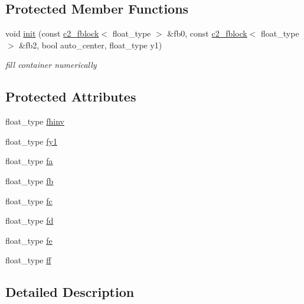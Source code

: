 \subsection*{Protected Member Functions}
\begin{DoxyCompactItemize}
\item 
void \hyperlink{classc2__connector__function__p_af5f4cfcfcaf990a779710f25dedfff9b}{init} (const \hyperlink{classc2__fblock}{c2\+\_\+fblock}$<$ float\+\_\+type $>$ \&fb0, const \hyperlink{classc2__fblock}{c2\+\_\+fblock}$<$ float\+\_\+type $>$ \&fb2, bool auto\+\_\+center, float\+\_\+type y1)
\begin{DoxyCompactList}\small\item\em fill container numerically \end{DoxyCompactList}\end{DoxyCompactItemize}
\subsection*{Protected Attributes}
\begin{DoxyCompactItemize}
\item 
float\+\_\+type \hyperlink{classc2__connector__function__p_aa9bafcf757d0607f897ab5e7d0acfb72}{fhinv}
\item 
float\+\_\+type \hyperlink{classc2__connector__function__p_a1e6f14a7d716a5915adf1985bbdc4c52}{fy1}
\item 
float\+\_\+type \hyperlink{classc2__connector__function__p_a3057f77c22dc61e93a1a3485780dd93f}{fa}
\item 
float\+\_\+type \hyperlink{classc2__connector__function__p_a3eff36726d4717fca41848605cd53916}{fb}
\item 
float\+\_\+type \hyperlink{classc2__connector__function__p_a0f0edb256a18551e2d054e47487d5b1d}{fc}
\item 
float\+\_\+type \hyperlink{classc2__connector__function__p_a2d06e77813b110a2c6ce09399d246704}{fd}
\item 
float\+\_\+type \hyperlink{classc2__connector__function__p_a64b954176b723477abf827e67bcfb7e7}{fe}
\item 
float\+\_\+type \hyperlink{classc2__connector__function__p_a39ca7caba5b003e6684eaf6c80920a8a}{ff}
\end{DoxyCompactItemize}


\subsection{Detailed Description}
